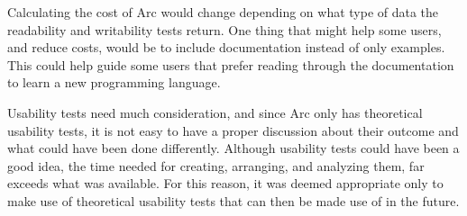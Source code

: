 Calculating the cost of Arc would change depending on what type of data the readability and writability tests return. One thing that might help some users, and reduce costs, would be to include documentation instead of only examples. This could help guide some users that prefer reading through the documentation to learn a new programming language. 

Usability tests need much consideration, and since Arc only has theoretical usability tests, it is not easy to have a proper discussion about their outcome and what could have been done differently. 
Although usability tests could have been a good idea, the time needed for creating, arranging, and analyzing them, far exceeds what was available. For this reason, it was deemed appropriate only to make use of theoretical usability tests that can then be made use of in the future.



